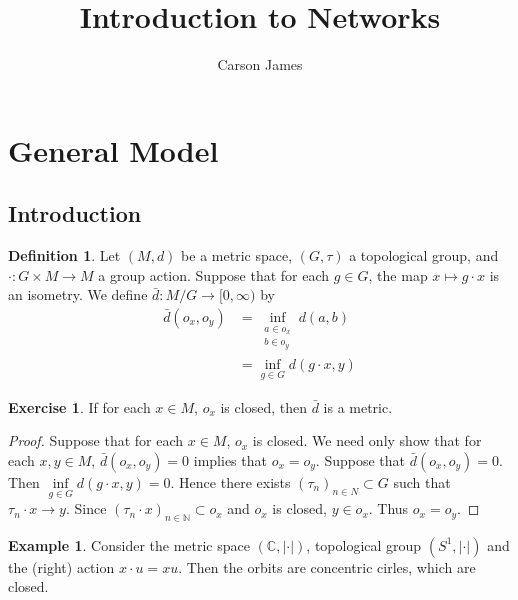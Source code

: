 \documentclass[12pt]{amsart}
\theoremstyle{definition}
\newtheorem{defn}[definition]{Definition}
\newtheorem{ex}[definition]{Exercise}
\newtheorem{exm}[definition]{Example}
\newcommand{\C}{\mathbb{C}}
\newcommand{\N}{\mathbb{N}}
\newcommand{\Rg}{[0,\infty)}
\begin{document}
	
	\title{Introduction to Networks}
	\author{Carson James}
	\maketitle
	
	\tableofcontents
	
	\section{General Model}
	\subsection{Introduction}
	\begin{defn}
	Let $(M, d)$ be a metric space, $(G, \tau)$ a topological group, and $\cdot: G \times M \rightarrow M$ a group action.  
	Suppose that for each $g \in G$, the map $x \mapsto g \cdot x$ is an isometry. We define 
	$\bar{d}: M / G \rightarrow \Rg$ by 
	\begin{align*}
	\bar{d}(o_x, o_y) 
	&= \inf_{\substack{a \in o_x \\ b \in o_y}} d(a,b) \\
	&= \inf_{g \in G} d(g \cdot x, y)
	\end{align*}
	
	\end{defn}
	
	
	
	\begin{ex}
	If for each $x \in M$, $o_x$ is closed, then $\bar{d}$ is a metric.
	\end{ex}
	
	\begin{proof}
	Suppose that for each $x \in M$, $o_x$ is closed. We need only show that for each $x,y \in M$, $\bar{d}(o_x , o_y) = 0$ implies that $o_x = o_y$. Suppose that $\bar{d}(o_x , o_y) = 0$. Then $\inf\limits_{ g \in G} d(g \cdot x, y) = 0$. Hence there exists $(\tau_n)_{n \in N} \subset G$ such that $\tau_n \cdot x \rightarrow y$. Since $(\tau_n \cdot x)_{n \in \N} \subset o_x$ and $o_x$ is closed, $y \in o_x$. Thus $o_x = o_y$. 
	\end{proof}
	
	\begin{exm}
	Consider the metric space $(\C, | \cdot |)$, topological group $(S^1, | \cdot |)$ and  the (right) action $x \cdot u = xu$. Then the orbits are concentric cirles, which are closed. 
	\end{exm}
	
\end{document}
